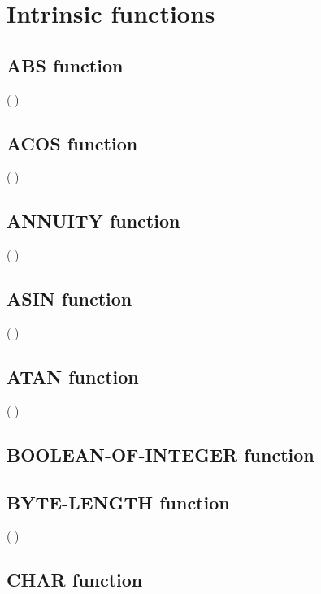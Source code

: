 \chapter{Intrinsic functions}

\section{ABS function}

  ( \argument )

\section{ACOS function}

  ( \argument)

\section{ANNUITY function}

  ( \argument \argument )

\section{ASIN function}

  ( \argument )

\section{ATAN function}

  ( \argument )

\section{BOOLEAN-OF-INTEGER function}


\section{BYTE-LENGTH function}

  ( \argument )

\section{CHAR function}

